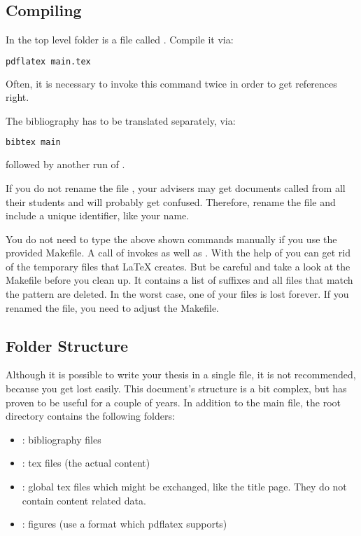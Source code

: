 \subsection{Compiling}
%
In the top level folder is a file called .
Compile it via:
%
\begin{lstlisting}[language=bash]
pdflatex main.tex
\end{lstlisting}
%
Often, it is necessary to invoke this command twice in order to
get references right.
%
\par
%
The bibliography has to be translated separately, via:
%
\begin{lstlisting}[language=bash]
bibtex main
\end{lstlisting}
%
followed by another run of .
%
\par
%
If you do not rename the file , your advisers
may get documents called  from all their students
and will probably get confused.
Therefore, rename the file and include a unique identifier, like
your name.
%
\par
%
You do not need to type the above shown commands manually if you
use the provided Makefile.
A call of  invokes  as well as .
With the help of  you can get rid of the temporary files
that \LaTeX{} creates.
But be careful and take a look at the Makefile before you clean up.
It contains a list of suffixes and all files that match the pattern
are deleted.
In the worst case, one of your files is lost forever.
If you renamed the  file, you need to adjust the Makefile.
%
\subsection{Folder Structure}
%
Although it is possible to write your thesis in a single file,
it is not recommended, because you get lost easily.
This document's structure is a bit complex, but has proven to be useful for
a couple of years.
In addition to the main file, the root directory contains the following folders:
\begin{itemize}
	\item {}: bibliography files
	\item {}: tex files (the actual content)
	\item {}: global tex files which might be exchanged,
		like the title page. They do not contain content related data.	
	\item {}: figures (use a format which pdflatex supports)
\end{itemize}
%
%
